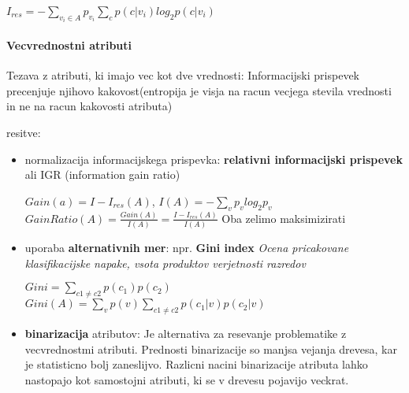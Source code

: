 \documentclass{article}
\begin{document}
\begin{multicols}{2}
\begin{center}
		\begin{math}
			I_{res} = - \sum_{v_i \in A} p_{v_i} \sum_c p(c|v_i) log_2 p(c|v_i)
		\end{math}
	\end{center}

	\paragraph{Vecvrednostni atributi}
	Tezava z atributi, ki imajo vec kot dve vrednosti: Informacijski prispevek precenjuje
	njihovo kakovost(entropija je visja na racun vecjega stevila vrednosti in ne na racun kakovosti atributa)

	resitve:
	\begin{itemize}
		\item normalizacija informacijskega prispevka: \textbf{relativni informacijski prispevek} ali IGR (information gain ratio)
		      \begin{center}
			      \begin{math}
				      Gain(a) = I - I_{res}(A)
			      \end{math},
			      \begin{math}
				      I(A) = - \sum_v p_v log_2 p_v
			      \end{math}
			      \begin{math}
				      GainRatio(A) = \frac{Gain(A)}{I(A)} = \frac{I - I_{res}(A)}{I(A)}
			      \end{math}
			      Oba zelimo maksimizirati
		      \end{center}

		\item uporaba \textbf{alternativnih mer}: npr. \textbf{Gini index}
		      \textit{Ocena pricakovane klasifikacijske napake, vsota produktov verjetnosti razredov}
		      \begin{center}
			      \begin{math}
				      Gini = \sum_{c1 \neq c2} p(c_1) p(c_2)
			      \end{math}
			      \begin{math}
				      Gini(A) = \sum_{v} p(v) \sum_{c1 \neq c2} p(c_1 | v) p(c_2 | v)
			      \end{math}
		      \end{center}
		\item \textbf{binarizacija} atributov:
		      Je alternativa za resevanje problematike z vecvrednostmi atributi.
		      Prednosti binarizacije so manjsa vejanja drevesa, kar je statisticno bolj zaneslijvo. Razlicni nacini
		      binarizacije atributa lahko nastopajo kot samostojni atributi, ki se v drevesu pojavijo veckrat.
	\end{itemize}


\end{multicols}
\end{document}
